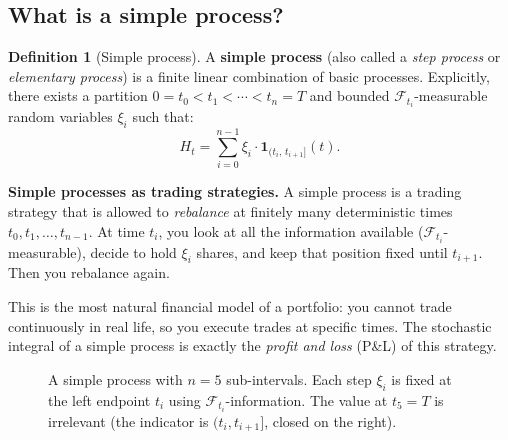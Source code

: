 \documentclass[11pt,a4paper]{article}
\theoremstyle{definition}
\newtheorem{definition}{Definition}[section]
\theoremstyle{plain}
\theoremstyle{remark}
\newcommand{\F}{\mathcal{F}}
\begin{document}
\subsection{What is a simple process?}

\begin{definition}[Simple process]
\label{def:simple}
A \textbf{simple process} (also called a \emph{step process} or \emph{elementary process}) is a finite linear combination of basic processes. Explicitly, there exists a partition $0 = t_0 < t_1 < \cdots < t_n = T$ and bounded $\F_{t_i}$-measurable random variables $\xi_i$ such that:
\begin{equation}
  \label{eq:simple}
  H_t = \sum_{i=0}^{n-1} \xi_i \cdot \mathbf{1}_{(t_i,\, t_{i+1}]}(t).
\end{equation}
\end{definition}

\begin{tutobox}
\textbf{Simple processes as trading strategies.}
A simple process is a trading strategy that is allowed to \emph{rebalance} at finitely many deterministic times $t_0, t_1, \ldots, t_{n-1}$. At time $t_i$, you look at all the information available ($\F_{t_i}$-measurable), decide to hold $\xi_i$ shares, and keep that position fixed until $t_{i+1}$. Then you rebalance again.

This is the most natural financial model of a portfolio: you cannot trade continuously in real life, so you execute trades at specific times. The stochastic integral of a simple process is exactly the \emph{profit and loss} (P\&L) of this strategy.
\end{tutobox}

\begin{figure}[h]
\centering
{}
\caption{A simple process with $n=5$ sub-intervals. Each step $\xi_i$ is fixed at the left endpoint $t_i$ using $\F_{t_i}$-information. The value at $t_5 = T$ is irrelevant (the indicator is $(t_i, t_{i+1}]$, closed on the right).}
\end{figure}
\end{document}
